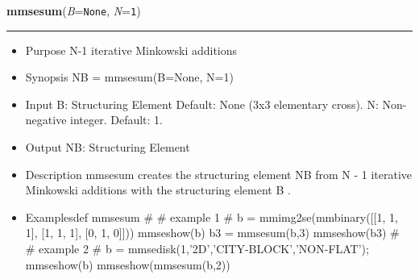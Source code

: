     \begin{boxedminipage}{\textwidth}

    \raggedright \textbf{mmsesum}(\textit{B}=\texttt{N\-o\-n\-e\-}, \textit{N}=\texttt{1\-})

    \vspace{-1.5ex}

    \rule{\textwidth}{0.5\fboxrule}
    \begin{itemize}
    \setlength{\parskip}{0.6ex}
      \item Purpose N-1 iterative Minkowski additions

      \item Synopsis NB = mmsesum(B=None, N=1)

      \item Input B: Structuring Element Default: None (3x3 elementary 
        cross). N: Non-negative integer. Default: 1.

      \item Output NB: Structuring Element

      \item Description mmsesum creates the structuring element NB from N - 1 
        iterative Minkowski additions with the structuring element B .

      \item Examplesdef mmsesum \# \# example 1 \# b = mmimg2se(mmbinary([[1, 
        1, 1], [1, 1, 1], [0, 1, 0]])) mmseshow(b) b3 = mmsesum(b,3) 
        mmseshow(b3) \# \# example 2 \# b = 
        mmsedisk(1,'2D','CITY-BLOCK','NON-FLAT'); mmseshow(b) 
        mmseshow(mmsesum(b,2))

    \end{itemize}

    \vspace{1ex}

    \end{boxedminipage}

    \label{multireg:num_pymorph:mmset2mat}
    \vspace{0.5ex}

